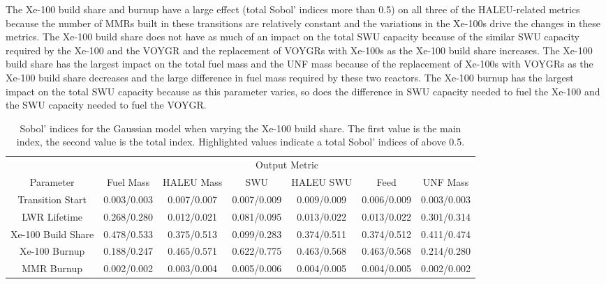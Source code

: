 The Xe-100 build share and burnup have a large effect (total Sobol' indices 
more than 0.5) on all three of the \gls{HALEU}-related metrics because the 
number of \glspl{MMR} built in these transitions are relatively constant and the 
variations in the Xe-100s drive the changes in these metrics. The Xe-100 build share 
does not have as much of an impact on the total \gls{SWU} capacity because 
of the similar \gls{SWU} capacity required by the Xe-100 and the VOYGR and 
the replacement of VOYGRs with Xe-100s as the Xe-100 build share increases. 
The Xe-100 build share has the largest impact on the total fuel mass 
and the \gls{UNF} mass because 
of the replacement of Xe-100s with VOYGRs as the Xe-100 build share decreases and 
the large difference in fuel mass required by these two reactors. The Xe-100 
burnup has the largest impact on the total \gls{SWU} capacity because as this 
parameter varies, so does the difference in \gls{SWU} capacity needed to fuel the Xe-100 
and the \gls{SWU} capacity needed to fuel the VOYGR.

\begin{table}[h!]
    \centering
    \caption{Sobol' indices for the Gaussian model when varying the 
    Xe-100 build share. The first value is the 
    main index, the second value is the total index. Highlighted 
    values indicate a total Sobol' indices of above 0.5.}
    \label{tab:s7_sobol_xe100_gaussian}
    \begin{tabular}{c c c c c c c}
        \hline
        & \multicolumn{6}{c}{Output Metric} \\
        Parameter & Fuel Mass & HALEU Mass & SWU & HALEU SWU & Feed & UNF Mass \\
        \hline
        Transition Start & 0.003/0.003 & 0.007/0.007 & 0.007/0.009 &
                           0.009/0.009 & 0.006/0.009 & 0.003/0.003\\
        LWR Lifetime & 0.268/0.280 & 0.012/0.021 & 0.081/0.095 &
                       0.013/0.022 & 0.013/0.022 & 0.301/0.314\\
        Xe-100 Build Share & \cellcolor{green!25}0.478/0.533 & \cellcolor{green!25}0.375/0.513 & 0.099/0.283 &
        \cellcolor{green!25}0.374/0.511 & \cellcolor{green!25}0.374/0.512 & 0.411/0.474\\
        Xe-100 Burnup & 0.188/0.247 & \cellcolor{green!25}0.465/0.571 & \cellcolor{green!25}0.622/0.775 & 
        \cellcolor{green!25}0.463/0.568 & \cellcolor{green!25}0.463/0.568 & 0.214/0.280\\
        MMR Burnup & 0.002/0.002 & 0.003/0.004 & 0.005/0.006 & 
                     0.004/0.005 & 0.004/0.005 & 0.002/0.002\\
        \hline        
    \end{tabular}
\end{table}

